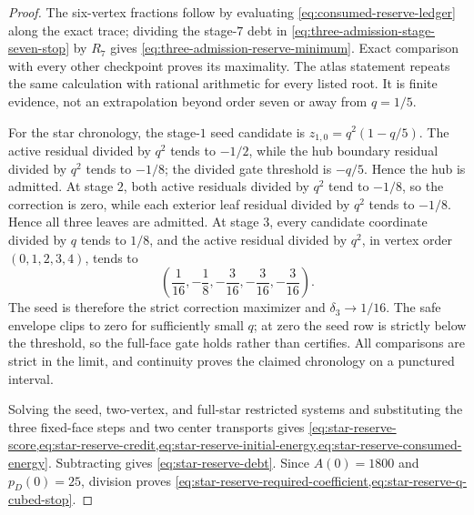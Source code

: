 \begin{proof}
The six-vertex fractions follow by evaluating
\cref{eq:consumed-reserve-ledger} along the exact trace; dividing the stage-$7$
debt in \cref{eq:three-admission-stage-seven-stop} by $R_7$ gives
\cref{eq:three-admission-reserve-minimum}.  Exact comparison with every other
checkpoint proves its maximality.  The atlas statement repeats the same
calculation with rational arithmetic for every listed root.  It is finite
evidence, not an extrapolation beyond order seven or away from $q=1/5$.

For the star chronology, the stage-$1$ seed candidate is
$z_{1,0}=q^2(1-q/5)$.  The active residual divided by $q^2$ tends to
$-1/2$, while the hub boundary residual divided by $q^2$ tends to $-1/8$;
the divided gate threshold is $-q/5$.  Hence the hub is admitted.  At stage
$2$, both active residuals divided by $q^2$ tend to $-1/8$, so the correction
is zero, while each exterior leaf residual divided by $q^2$ tends to
$-1/8$.  Hence all three leaves are admitted.  At stage $3$, every candidate
coordinate divided by $q$ tends to $1/8$, and the active residual divided by
$q^2$, in vertex order $(0,1,2,3,4)$, tends to
\begin{equation*}
 \left(\frac1{16},-\frac18,-\frac3{16},-\frac3{16},-\frac3{16}\right).
\end{equation*}
The seed is therefore the strict correction maximizer and
$\delta_3\to1/16$.  The safe envelope clips to zero for sufficiently small
$q$; at zero the seed row is strictly below the threshold, so the full-face
gate holds rather than certifies.  All comparisons are strict in the limit,
and continuity proves the claimed chronology on a punctured interval.

Solving the seed, two-vertex, and full-star restricted systems and substituting
the three fixed-face steps and two center transports gives
\cref{eq:star-reserve-score,eq:star-reserve-credit,eq:star-reserve-initial-energy,eq:star-reserve-consumed-energy}.
Subtracting gives \cref{eq:star-reserve-debt}.  Since
$A(0)=1800$ and $p_D(0)=25$, division proves
\cref{eq:star-reserve-required-coefficient,eq:star-reserve-q-cubed-stop}.
\end{proof}

